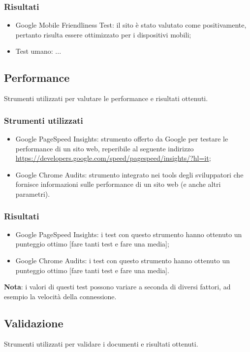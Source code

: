 \documentclass[12pt]{article}
\begin{document}
	\subsubsection{Risultati}
		\begin{itemize}
			\item Google Mobile Friendliness Test: il sito è stato valutato come positivamente, pertanto risulta essere ottimizzato per i dispositivi mobili;
			\item Test umano: ...
		\end{itemize}
	\subsection{Performance}
	Strumenti utilizzati per valutare le performance e risultati ottenuti.
	\subsubsection{Strumenti utilizzati}
		\begin{itemize}
			\item Google PageSpeed Insights: strumento offerto da Google per testare le performance di un sito web, reperibile al seguente indirizzo \url{https://developers.google.com/speed/pagespeed/insights/?hl=it};
			\item Google Chrome Audits: strumento integrato nei tools degli sviluppatori che fornisce informazioni sulle performance di un sito web (e anche altri parametri).
		\end{itemize}
	\subsubsection{Risultati}
		\begin{itemize}
			\item Google PageSpeed Insights: i test con questo strumento hanno ottenuto un punteggio ottimo [fare tanti test e fare una media];
			\item Google Chrome Audits: i test con questo strumento hanno ottenuto un punteggio ottimo [fare tanti test e fare una media].
		\end{itemize}
	\textbf{Nota}: i valori di questi test possono variare a seconda di diversi fattori, ad esempio la velocità della connessione.
	\subsection{Validazione}
	Strumenti utilizzati per validare i documenti e risultati ottenuti.
\end{document}
